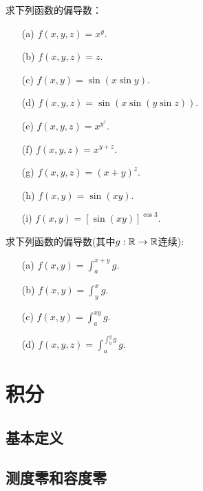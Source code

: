 \begin{problemset}
\item\label{exer009020217} 求下列函数的偏导数：
\begin{enumerate}
\item[(a)] $f(x, y, z) = x^y$.
\item[(b)] $f(x, y, z) = z$.
\item[(c)] $f(x, y) = \sin(x\sin{y})$.
\item[(d)] $f(x, y, z) = \sin(x\sin(y\sin{z}))$.
\item[(e)] $f(x, y, z) = x^{y^z}$.
\item[(f)] $f(x, y, z) = x^{y+z}$.
\item[(g)] $f(x, y, z) = (x + y)^z$.
\item[(h)] $f(x, y) = \sin(xy)$.
\item[(i)] $f(x, y) = [\sin(xy)]^{\cos{3}}$.
\end{enumerate}

\item 求下列函数的偏导数(其中$g:\mathbb{R}\to\mathbb{R}$连续):
\begin{enumerate}
\item[(a)] $f(x, y) = \int_{a}^{x+y}{g}$.
\item[(b)] $f(x, y) = \int_{y}^{x}{g}$.
\item[(c)] $f(x, y) = \int_{a}^{xy}{g}$.
\item[(d)] $f(x, y, z) = \int_{a}^{\int_{b}^{y}{g}}{g}$.
\end{enumerate}

\end{problemset}


\chapter{积分}\label{chapter00903}
\section{基本定义}\label{section0090301}





\section{测度零和容度零}\label{section0090302}



